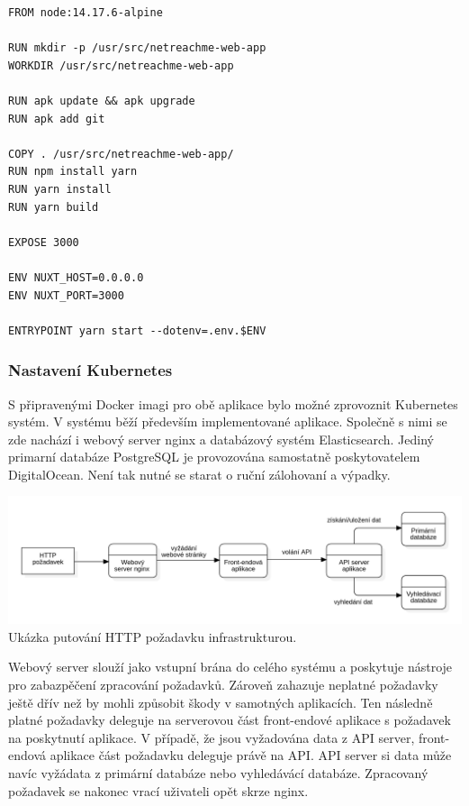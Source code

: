		\begin{lstlisting}
FROM node:14.17.6-alpine

RUN mkdir -p /usr/src/netreachme-web-app
WORKDIR /usr/src/netreachme-web-app

RUN apk update && apk upgrade
RUN apk add git

COPY . /usr/src/netreachme-web-app/
RUN npm install yarn
RUN yarn install
RUN yarn build

EXPOSE 3000

ENV NUXT_HOST=0.0.0.0
ENV NUXT_PORT=3000

ENTRYPOINT yarn start --dotenv=.env.$ENV
		\end{lstlisting}

		\subsubsection{Nastavení Kubernetes}

		S připravenými Docker imagi pro obě aplikace bylo možné zprovoznit Kubernetes systém.
		V systému běží především implementované aplikace.
		Společně s nimi se zde nachází i webový server nginx a databázový systém Elasticsearch.
		Jediný primarní databáze PostgreSQL je provozována samostatně poskytovatelem DigitalOcean.
		Není tak nutné se starat o ruční zálohovaní a výpadky.

		\includegraphics{obrazky/architektura_produkce}\hfill
		Ukázka putování HTTP požadavku infrastrukturou. %

		Webový server slouží jako vstupní brána do celého systému a poskytuje nástroje pro zabazpěčení
		zpracování požadavků.
		Zároveň zahazuje neplatné požadavky ještě dřív než by mohli způsobit škody v samotných aplikacích.
		Ten následně platné požadavky deleguje na serverovou část front-endové aplikace s požadavek na poskytnutí aplikace.
		V případě, že jsou vyžadována data z API server, front-endová aplikace část požadavku deleguje právě na \ac{API}.
		\ac{API} server si data může navíc vyžádata z primární databáze nebo vyhledávácí databáze.
		Zpracovaný požadavek se nakonec vrací uživateli opět skrze nginx.

